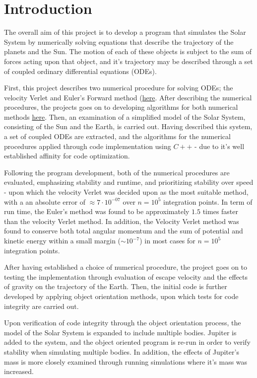 \documentclass[%
oneside,                 %
final,                   %
10pt]{article}
\begin{document}
\section{Introduction}
The overall aim of this project is to develop a program that simulates the Solar System by numerically solving equations that describe the trajectory of the planets and the Sun. The motion of each of these objects is subject to the sum of forces acting upon that object, and it's trajectory may be described through a set of coupled ordinary differential equations (ODEs). \newline

First, this project describes two numerical procedure for solving ODEs; the velocity Verlet and Euler's Forward method (\hyperref[sec:NPs]{here}. After describing the numerical procedures, the projects goes on to developing algorithms for both numerical methods \hyperref[sec:NPalgo]{here}. Then, an examination of a simplified model of the Solar System, consisting of the Sun and the Earth, is carried out. Having described this system, a set of coupled ODEs are extracted, and the algorithms for the numerical procedures applied through code implementation using $C++$ - due to it's well established affinity for code optimization. \newline

Following the program development, both of the numerical procedures are evaluated, emphasizing stability and runtime, and prioritizing stability over speed - upon which the velocity Verlet was decided upon as the most suitable method, with a an absolute error of $\approx 7 \cdot 10^{-07}$ over $n=10^5$ integration points. In term of run time, the Euler's method was found to be approximately $1.5$ times faster than the velocity Verlet method. In addition, the Velocity Verlet method was found to conserve both total angular momentum and the sum of potential and kinetic energy within a small margin ($\sim 10^{-7}$) in most cases for $n=10^5$ integration points. \newline

After having established a choice of numerical procedure, the project goes on to testing the implementation through evaluation of escape velocity and the effects of gravity on the trajectory of the Earth. Then, the initial code is further developed by applying object orientation methods, upon which tests for code integrity are carried out. \newline

Upon verification of code integrity through the object orientation process, the model of the Solar System is expanded to include multiple bodies. Jupiter is added to the system, and the object oriented program is re-run in order to verify stability when simulating multiple bodies. In addition, the effects of Jupiter's mass is more closely examined through running simulations where it's mass was increased. \newline
\end{document}
